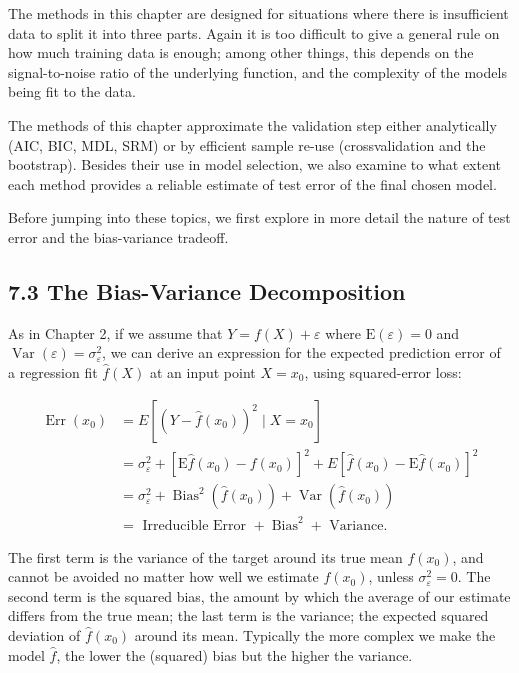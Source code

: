 \documentclass[10pt]{article}
\begin{document}
The methods in this chapter are designed for situations where there is insufficient data to split it into three parts. Again it is too difficult to give a general rule on how much training data is enough; among other things, this depends on the signal-to-noise ratio of the underlying function, and the complexity of the models being fit to the data.

The methods of this chapter approximate the validation step either analytically (AIC, BIC, MDL, SRM) or by efficient sample re-use (crossvalidation and the bootstrap). Besides their use in model selection, we also examine to what extent each method provides a reliable estimate of test error of the final chosen model.

Before jumping into these topics, we first explore in more detail the nature of test error and the bias-variance tradeoff.

\subsection*{7.3 The Bias-Variance Decomposition}
As in Chapter 2, if we assume that $Y=f(X)+\varepsilon$ where $\mathrm{E}(\varepsilon)=0$ and $\operatorname{Var}(\varepsilon)=\sigma_{\varepsilon}^{2}$, we can derive an expression for the expected prediction error of a regression fit $\hat{f}(X)$ at an input point $X=x_{0}$, using squared-error loss:


\begin{align*}
\operatorname{Err}\left(x_{0}\right) & =E\left[\left(Y-\hat{f}\left(x_{0}\right)\right)^{2} \mid X=x_{0}\right] \\
& =\sigma_{\varepsilon}^{2}+\left[\mathrm{E} \hat{f}\left(x_{0}\right)-f\left(x_{0}\right)\right]^{2}+E\left[\hat{f}\left(x_{0}\right)-\mathrm{E} \hat{f}\left(x_{0}\right)\right]^{2} \\
& =\sigma_{\varepsilon}^{2}+\operatorname{Bias}^{2}\left(\hat{f}\left(x_{0}\right)\right)+\operatorname{Var}\left(\hat{f}\left(x_{0}\right)\right) \\
& =\text { Irreducible Error }+\operatorname{Bias}^{2}+\text { Variance. } \tag{7.9}
\end{align*}


The first term is the variance of the target around its true mean $f\left(x_{0}\right)$, and cannot be avoided no matter how well we estimate $f\left(x_{0}\right)$, unless $\sigma_{\varepsilon}^{2}=0$. The second term is the squared bias, the amount by which the average of our estimate differs from the true mean; the last term is the variance; the expected squared deviation of $\hat{f}\left(x_{0}\right)$ around its mean. Typically the more complex we make the model $\hat{f}$, the lower the (squared) bias but the higher the variance.
\end{document}
